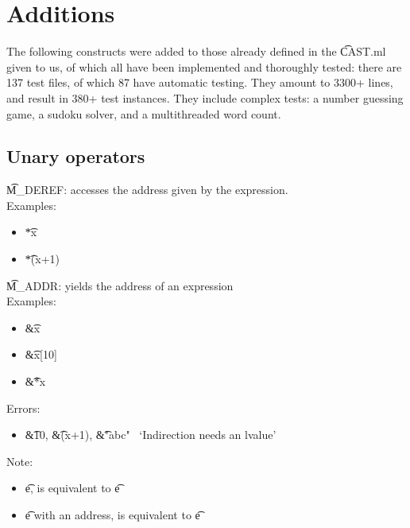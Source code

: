 \section{Additions}

The following constructs were added to those already defined in the \t{CAST.ml} given to us, of which all have been implemented and thoroughly tested: there are 137 test files, of which 87 have automatic testing. They amount to 3300+ lines, and result in 380+ test instances. They include complex tests: a number guessing game, a sudoku solver, and a multithreaded word count.

\subsection{Unary operators}
\t{M\_DEREF}: accesses the address given by the expression.\\
Examples:
\begin{itemize}
    \item \t{*x} \to\ 
    \item \t{*(x+1)} \to\ 
\end{itemize}

\t{M\_ADDR}: yields the address of an expression\\
Examples:
\begin{itemize}
    \item \t{\&x} \to\ 
    \item \t{\&x[10]} \to\ 
    \item \t{\&*x} \to\ 
\end{itemize}
Errors:
\begin{itemize}
    \item \t{\&10}, \t{\&(x+1)}, \t{\&"abc"} \to\ `Indirection needs an lvalue'
\end{itemize}

Note:
\begin{itemize}
    \item \forall \t{e},  is equivalent to \t{e}
    \item \forall \t{e} with an address,  is equivalent to \t{e}
\end{itemize}


